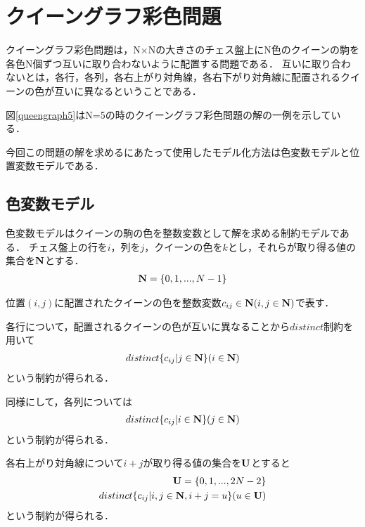 \chapter{クイーングラフ彩色問題}

クイーングラフ彩色問題は，N×Nの大きさのチェス盤上にN色のクイーンの駒を各色N個ずつ互いに取り合わないように配置する問題である．
互いに取り合わないとは，各行，各列，各右上がり対角線，各右下がり対角線に配置されるクイーンの色が互いに異なるということである．

\label{fig:queengraph5}

図\ref{queengraph5}はN=5の時のクイーングラフ彩色問題の解の一例を示している．

今回この問題の解を求めるにあたって使用したモデル化方法は色変数モデルと位置変数モデルである．

\section{色変数モデル}
色変数モデルはクイーンの駒の色を整数変数として解を求める制約モデルである．
チェス盤上の行を$i$，列を$j$，クイーンの色を$k$とし，それらが取り得る値の集合を$\bf N$とする．
\begin{eqnarray*}
    {\bf N} = \{0,1,...,N-1\}
\end{eqnarray*}

位置$(i,j)$に配置されたクイーンの色を整数変数$c_{ij} \in {\bf N} (i,j \in {\bf N})$で表す．

各行について，配置されるクイーンの色が互いに異なることから$distinct$制約を用いて
\begin{eqnarray*}
    distinct\{c_{ij} | j \in {\bf N} \} (i \in {\bf N})
\end{eqnarray*}
という制約が得られる．

同様にして，各列については
\begin{eqnarray*}
    distinct\{c_{ij} | i \in {\bf N} \} (j \in {\bf N})
\end{eqnarray*}
という制約が得られる．

各右上がり対角線について$i+j$が取り得る値の集合を$\bf U$とすると
\begin{eqnarray*}
    {\bf U} = \{0,1,...,2N-2\} \\
    distinct\{c_{ij} | i,j \in {\bf N}, i+j=u \} (u \in {\bf U})
\end{eqnarray*}
という制約が得られる．

